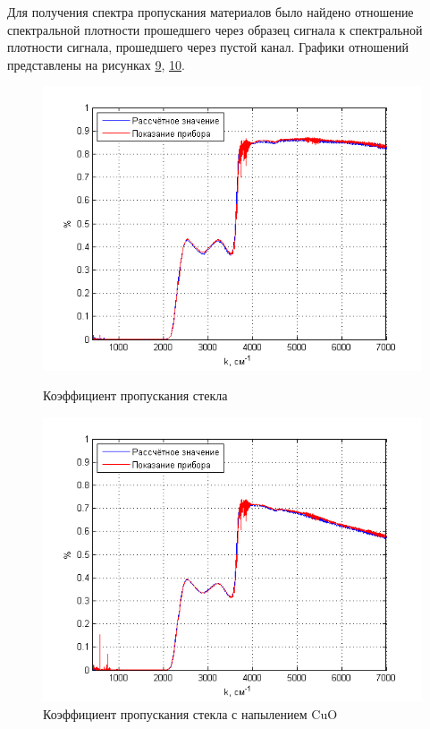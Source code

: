 \documentclass[a4paper,12pt]{article} %
\begin{document}
    Для получения спектра пропускания материалов было найдено отношение спектральной плотности прошедшего через образец сигнала 
    к спектральной плотности сигнала, прошедшего через пустой канал. Графики отношений представлены на рисунках 
    \hyperref[picture_9]{9}, \hyperref[picture_10]{10}.

    \newpage

    \begin{figure}[h!]
        \begin{center}
            \begin{minipage}[h!]{0.48\linewidth}
                \includegraphics[width=1\linewidth]{9.png}
                \caption{Коэффициент пропускания стекла}
                \label{picture_9}
            \end{minipage}
            \hfill
            \begin{minipage}[h!]{0.48\linewidth}
                \includegraphics[width=1\linewidth]{10.png}
                \caption{Коэффициент пропускания стекла с напылением CuO}
                \label{picture_10}
            \end{minipage}
        \end{center}
    \end{figure}
\end{document}
